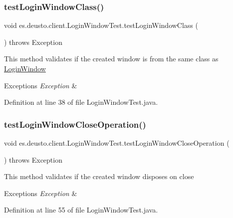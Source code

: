 \subsubsection{\texorpdfstring{test\+Login\+Window\+Class()}{testLoginWindowClass()}}
{\footnotesize\ttfamily void es.\+deusto.\+client.\+Login\+Window\+Test.\+test\+Login\+Window\+Class (\begin{DoxyParamCaption}{ }\end{DoxyParamCaption}) throws Exception}

This method validates if the created window is from the same class as \hyperlink{classes_1_1deusto_1_1client_1_1_login_window}{Login\+Window} 
\begin{DoxyExceptions}{Exceptions}
{\em Exception} & \\
\hline
\end{DoxyExceptions}


Definition at line 38 of file Login\+Window\+Test.\+java.

\mbox{\label{classes_1_1deusto_1_1client_1_1_login_window_test_a65a992d1184421c2aff6afaf3cedbe7c}} 
\subsubsection{\texorpdfstring{test\+Login\+Window\+Close\+Operation()}{testLoginWindowCloseOperation()}}
{\footnotesize\ttfamily void es.\+deusto.\+client.\+Login\+Window\+Test.\+test\+Login\+Window\+Close\+Operation (\begin{DoxyParamCaption}{ }\end{DoxyParamCaption}) throws Exception}

This method validates if the created window disposes on close 
\begin{DoxyExceptions}{Exceptions}
{\em Exception} & \\
\hline
\end{DoxyExceptions}


Definition at line 55 of file Login\+Window\+Test.\+java.

\mbox{\label{classes_1_1deusto_1_1client_1_1_login_window_test_af3a9c3aab7052bc279bd98b5f34dc574}} 
